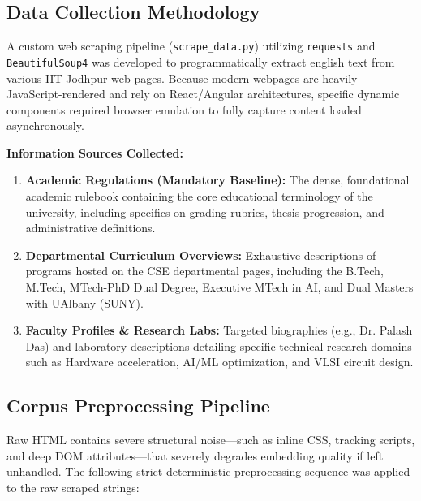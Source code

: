 \documentclass[11pt,a4paper]{article}
\begin{document}
\subsection{Data Collection Methodology}
A custom web scraping pipeline (\texttt{scrape\_data.py}) utilizing \texttt{requests} and \texttt{BeautifulSoup4} was developed to programmatically extract english text from various IIT Jodhpur web pages. Because modern webpages are heavily JavaScript-rendered and rely on React/Angular architectures, specific dynamic components required browser emulation to fully capture content loaded asynchronously.

\textbf{Information Sources Collected:}
\begin{enumerate}[label=\textbf{\textcolor{iitjblue}{\arabic*.}}, itemsep=0.5em]
    \justifying
    \item \textbf{Academic Regulations (Mandatory Baseline):} The dense, foundational academic rulebook containing the core educational terminology of the university, including specifics on grading rubrics, thesis progression, and administrative definitions.
    \item \textbf{Departmental Curriculum Overviews:} Exhaustive descriptions of programs hosted on the CSE departmental pages, including the B.Tech, M.Tech, MTech-PhD Dual Degree, Executive MTech in AI, and Dual Masters with UAlbany (SUNY).
    \item \textbf{Faculty Profiles \& Research Labs:} Targeted biographies (e.g., Dr. Palash Das) and laboratory descriptions detailing specific technical research domains such as Hardware acceleration, AI/ML optimization, and VLSI circuit design.
\end{enumerate}

\subsection{Corpus Preprocessing Pipeline}
Raw HTML contains severe structural noise—such as inline CSS, tracking scripts, and deep DOM attributes—that severely degrades embedding quality if left unhandled. The following strict deterministic preprocessing sequence was applied to the raw scraped strings:
\end{document}

